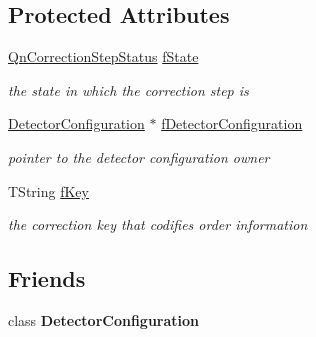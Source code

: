 \subsection*{Protected Attributes}
\begin{DoxyCompactItemize}
\item 
\mbox{\label{classQn_1_1CorrectionStepBase_a3755e8aba5a18d36f452a09685037cef}} 
\mbox{\hyperlink{classQn_1_1CorrectionStepBase_a95ce2afbf677e1303b632df2399c8620}{Qn\+Correction\+Step\+Status}} \mbox{\hyperlink{classQn_1_1CorrectionStepBase_a3755e8aba5a18d36f452a09685037cef}{f\+State}}
\begin{DoxyCompactList}\small\item\em the state in which the correction step is \end{DoxyCompactList}\item 
\mbox{\label{classQn_1_1CorrectionStepBase_af1955a033ec55de3c02e712d1ca3ce78}} 
\mbox{\hyperlink{classQn_1_1DetectorConfiguration}{Detector\+Configuration}} $\ast$ \mbox{\hyperlink{classQn_1_1CorrectionStepBase_af1955a033ec55de3c02e712d1ca3ce78}{f\+Detector\+Configuration}}
\begin{DoxyCompactList}\small\item\em pointer to the detector configuration owner \end{DoxyCompactList}\item 
\mbox{\label{classQn_1_1CorrectionStepBase_a25d7131d72a947511ed0e5787bb23167}} 
T\+String \mbox{\hyperlink{classQn_1_1CorrectionStepBase_a25d7131d72a947511ed0e5787bb23167}{f\+Key}}
\begin{DoxyCompactList}\small\item\em the correction key that codifies order information \end{DoxyCompactList}\end{DoxyCompactItemize}
\subsection*{Friends}
\begin{DoxyCompactItemize}
\item 
\mbox{\label{classQn_1_1CorrectionStepBase_a60f3cd859ede2b521d84121ea7a37ffb}} 
class {\bfseries Detector\+Configuration}
\end{DoxyCompactItemize}


